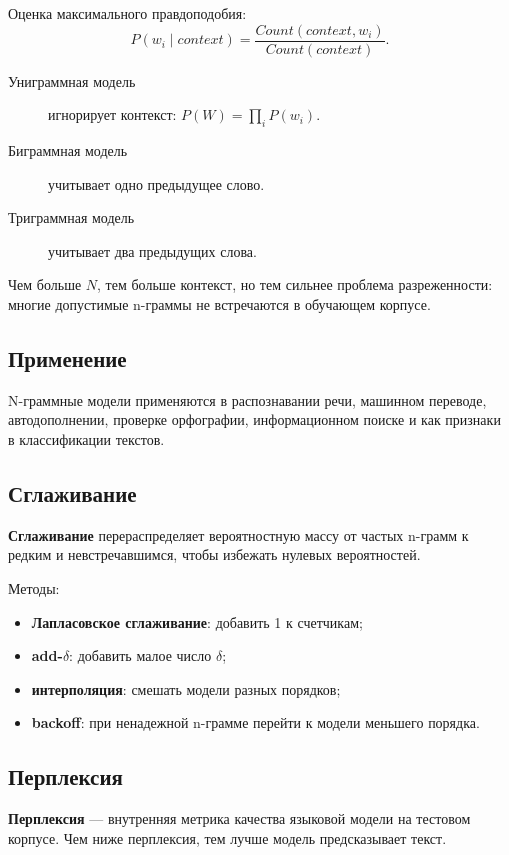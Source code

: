 Оценка максимального правдоподобия:
\[
P(w_i\mid context)=\frac{Count(context,w_i)}{Count(context)}.
\]

\begin{description}
    \item[Униграммная модель] игнорирует контекст: $P(W)=\prod_i P(w_i)$.
    \item[Биграммная модель] учитывает одно предыдущее слово.
    \item[Триграммная модель] учитывает два предыдущих слова.
\end{description}

Чем больше $N$, тем больше контекст, но тем сильнее проблема разреженности: многие допустимые n-граммы не встречаются в обучающем корпусе.

\subsection*{Применение}

N-граммные модели применяются в распознавании речи, машинном переводе, автодополнении, проверке орфографии, информационном поиске и как признаки в классификации текстов.

\subsection*{Сглаживание}

\textbf{Сглаживание} перераспределяет вероятностную массу от частых n-грамм к редким и невстречавшимся, чтобы избежать нулевых вероятностей.

Методы:
\begin{itemize}
    \item \textbf{Лапласовское сглаживание}: добавить 1 к счетчикам;
    \item \textbf{add-$\delta$}: добавить малое число $\delta$;
    \item \textbf{интерполяция}: смешать модели разных порядков;
    \item \textbf{backoff}: при ненадежной n-грамме перейти к модели меньшего порядка.
\end{itemize}

\subsection*{Перплексия}

\textbf{Перплексия} --- внутренняя метрика качества языковой модели на тестовом корпусе. Чем ниже перплексия, тем лучше модель предсказывает текст.

